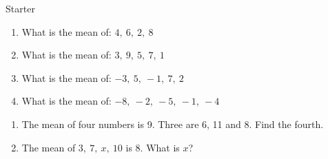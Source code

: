 \documentclass{beamer}
\newcommand{\ashow}[1]{\uncover<2->{\textcolor{red}{\small #1}}}
\newcommand{\ashowq}[1]{\alt<2->{\textcolor{red}{\small #1}}{?}}
\begin{document}
\begin{frame}{Starter}
\vspace{-0.8em}

\footnotesize
\vspace{0.2em}
\begin{enumerate}\itemsep1pt
  \vspace{-1em}
  \item What is the mean of: $4,\ 6,\ 2,\ 8$ \ashow{5}
  \item What is the mean  of: $3,\ 9,\ 5,\ 7,\ 1$ \ashow{5}
  \item What is the mean  of: $-3,\ 5,\ -1,\ 7,\ 2$ \ashow{2}
  \item What is the mean  of: $-8,\ -2,\ -5,\ -1,\ -4$ \ashow{$-4$}
\end{enumerate}

\begin{enumerate}\itemsep1pt
  \setcounter{enumi}8
  \item The mean of four numbers is 9. Three are 6, 11 and 8. Find the fourth. \ashow{11}
  \item The mean of $3,\ 7,\ x,\ 10$ is $8$. What is $x$? \ashow{12}
\end{enumerate}


\end{frame}
\end{document}
